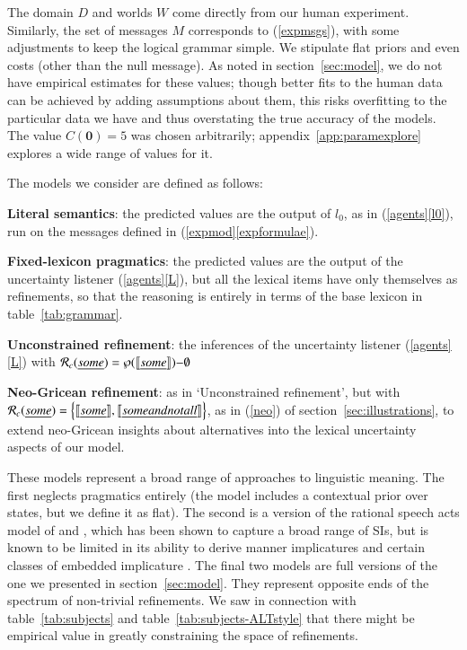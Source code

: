 \documentclass[leqno,12pt]{article}
\newcommand{\secref}[1]{section~\ref{#1}}
\newcommand{\tabref}[1]{table~\ref{#1}}
\newcommand{\appendixref}[1]{appendix~\ref{#1}}
\newcommand{\eg}[1]{(\ref{#1})}
\newcommand{\subeg}[2]{(\ref{#1}\ref{#2})}
\newcommand{\word}[1]{\emph{#1}}
\newcommand{\tech}[1]{\textbf{#1}}
\newcommand{\set}[1]{\ensuremath{\left\{ #1 \right\}}}
\newcommand{\sem}[1]{\ensuremath{\llbracket#1\rrbracket}}
\newcommand{\Messages}{M}
\newcommand{\Costs}{C}
\newcommand{\listenerZero}{l_{0}}
\newcommand{\nullmsg}{\mathbf{0}}
\newcommand{\Refine}[1][c]{\mathcal{R}_{#1}}
\newcommand{\Worlds}{W}
\newcommand{\Domain}{D}
\begin{document}
{The domain $\Domain$ and worlds $\Worlds$ come directly from our human
experiment. Similarly, the set of messages $\Messages$ corresponds to
\eg{expmsgs}, with some adjustments to keep the logical grammar
simple. We stipulate flat priors and even costs (other than the null
message). As noted in \secref{sec:model}, we do not have empirical
estimates for these values; though better fits to the human data can
be achieved by adding assumptions about them, this risks overfitting
to the particular data we have and thus overstating the true accuracy
of the models. The value $\Costs(\nullmsg) = 5$ was chosen
arbitrarily; \appendixref{app:paramexplore} explores a wide range of
values for it.

The models we consider are defined as follows:
%
\begin{examples}
\item 
  \begin{examples}
  \item \tech{Literal semantics}: the predicted values are the output
    of $\listenerZero$, as in \subeg{agents}{l0}, run on the messages
    defined in \subeg{expmod}{expformulae}.
  \item \tech{Fixed-lexicon pragmatics}: the predicted values are the
    output of the uncertainty listener \subeg{agents}{L}, but all the
    lexical items have only themselves as refinements, so that the
    reasoning is entirely in terms of the base lexicon in
    \tabref{tab:grammar}.
  \item \tech{Unconstrained refinement}: the inferences of the
    uncertainty listener \subeg{agents}{L} with $\Refine(\word{some})
    = \wp(\sem{\word{some}}){-}\emptyset$
  \item \tech{Neo-Gricean refinement}: as in `Unconstrained
    refinement', but with
    $\Refine(\word{some}) = \set{\sem{\word{some}}, \sem{\word{some
          and not all}}}$,
    as in \eg{neo} of \secref{sec:illustrations}, 
    to extend neo-Gricean insights about alternatives into
    the lexical uncertainty aspects of our model.
  \end{examples}
\end{examples}

These models represent a broad range of approaches to linguistic
meaning. The first neglects pragmatics entirely (the model includes a
contextual prior over states, but we define it as flat). The second is
a version of the rational speech acts model of
\citet{Frank:Goodman:2012} and \citet{Goodman:Stuhlmuller:2013}, which
has been shown to capture a broad range of SIs, but is known to be
limited in its ability to derive manner implicatures and certain
classes of embedded implicature
\citep{Bergen:Goodman:Levy:2012,Bergen:Levy:Goodman:2014}. The final
two models are full versions of the one we presented in
\secref{sec:model}. They represent opposite ends of the spectrum of
non-trivial refinements. We saw in connection with
\tabref{tab:subjects} and \tabref{tab:subjects-ALTstyle} that there
might be empirical value in greatly constraining the space of
refinements.  

}
\end{document}
